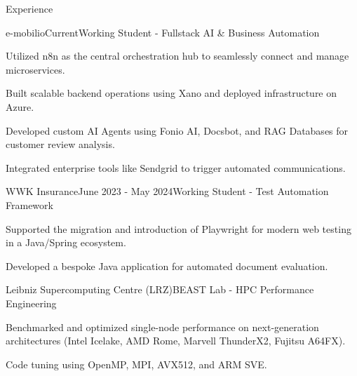 \documentclass{resume} %
\begin{document}
\begin{rSection}{Experience}

\begin{rSubsection}{e-mobilio}{Current}{Working Student - Fullstack AI \& Business Automation}{}
\item Utilized n8n as the central orchestration hub to seamlessly connect and manage microservices.
\item Built scalable backend operations using Xano and deployed infrastructure on Azure.
\item Developed custom AI Agents using Fonio AI, Docsbot, and RAG Databases for customer review analysis.
\item Integrated enterprise tools like Sendgrid to trigger automated communications.
\end{rSubsection}

\begin{rSubsection}{WWK Insurance}{June 2023 - May 2024}{Working Student - Test Automation Framework}{}
\item Supported the migration and introduction of Playwright for modern web testing in a Java/Spring ecosystem.
\item Developed a bespoke Java application for automated document evaluation.
\end{rSubsection}

\begin{rSubsection}{Leibniz Supercomputing Centre (LRZ)}{}{BEAST Lab - HPC Performance Engineering}{}
\item Benchmarked and optimized single-node performance on next-generation architectures (Intel Icelake, AMD Rome, Marvell ThunderX2, Fujitsu A64FX).
\item Code tuning using OpenMP, MPI, AVX512, and ARM SVE.
\end{rSubsection}

\end{rSection} 
\end{document}
